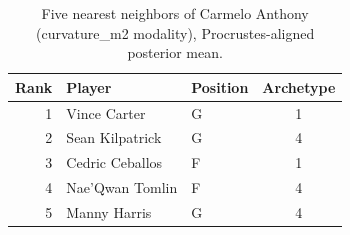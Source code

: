 \begin{table}[htbp]
  \centering\small
  \begin{tabular}{rllc}
    \toprule
    Rank & Player & Position & Archetype \\
    \midrule
    1 & Vince Carter & G & 1 \\
    2 & Sean Kilpatrick & G & 4 \\
    3 & Cedric Ceballos & F & 1 \\
    4 & Nae'Qwan Tomlin & F & 4 \\
    5 & Manny Harris & G & 4 \\
    \bottomrule
  \end{tabular}
  \caption{Five nearest neighbors of Carmelo Anthony (curvature_m2 modality), Procrustes-aligned posterior mean.}
  \label{tab:Carmelo_Anthony_neighbors_curvature_m2}
\end{table}

